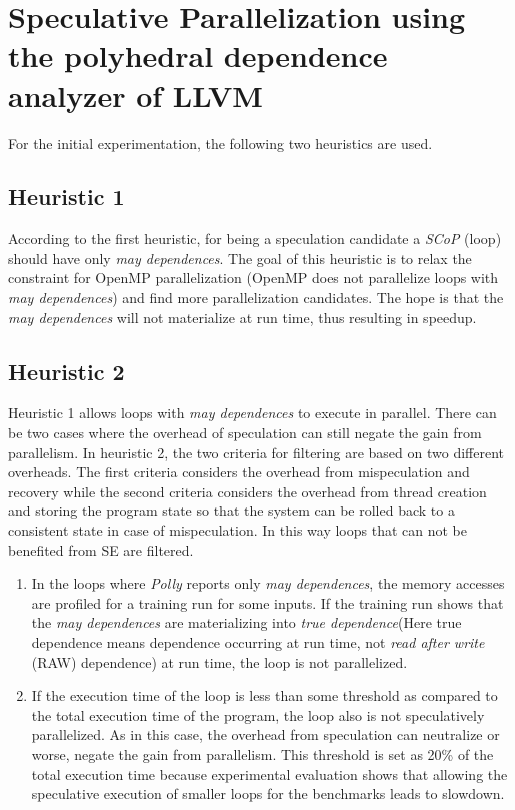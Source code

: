 \documentclass[10pt]{report}          %
\begin{document}
\section{Speculative Parallelization using the polyhedral dependence analyzer of LLVM}
\label{section:heuristics}

For the initial experimentation, the following two heuristics are used.  

\subsection{Heuristic 1}

According to the first heuristic,  for being a speculation candidate a \textit{SCoP} (loop) should have only \textit{may dependences}. The goal of this heuristic is to relax the constraint for OpenMP parallelization (OpenMP does not parallelize loops with \textit{may dependences}) and find more parallelization candidates.  The hope is that the \textit{may dependences} will not materialize at run time, thus resulting in speedup. 
 
\subsection{Heuristic 2}

Heuristic 1 allows loops with \textit{may dependences} to execute in parallel.  There can be two cases where the overhead of speculation can still negate the gain from parallelism. In heuristic 2, the two criteria for filtering are based on two different overheads. The first criteria considers the overhead from mispeculation and recovery while the second criteria considers the overhead from thread creation and storing the program state so that the system can be rolled back to a consistent state in case of mispeculation.  In this way loops that can not be benefited from SE are filtered. 

\begin{enumerate}
\item In the loops where \textit{Polly} reports only \textit{may dependences}, the memory accesses are profiled for a training run for some inputs.  If the training run shows that the \textit{may dependences} are materializing into \textit{true dependence}(Here true dependence means dependence occurring at run time, not \textit{read after write} (RAW) dependence) at run time, the loop is not parallelized.
\item If the execution time of the loop is less than some threshold as compared to the total execution time of the program, the loop also is not speculatively parallelized.  As in this case, the overhead from speculation can neutralize or worse, negate the gain from parallelism. This threshold is set as 20\% of the total execution time because experimental evaluation shows that allowing  the speculative execution of smaller loops for the benchmarks leads to slowdown. 
\end{enumerate}
\end{document}
